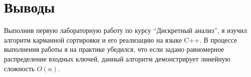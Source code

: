 \documentclass[unicode, 12pt, a4paper,oneside,fleqn]{article}
\begin{document}
\pagebreak

\section{Выводы}
Выполнив первую лабораторную работу по курсу \enquote{Дискретный анализ}, я изучил алгоритм карманной сортировки и его реализацию на языке C++. 
В процессе выполнения работы я на практике убедился, что если задано равномерное распределение входных ключей, данный алгоритм демонстрирует линейную сложность $O(n)$.

\pagebreak


\end{document}
